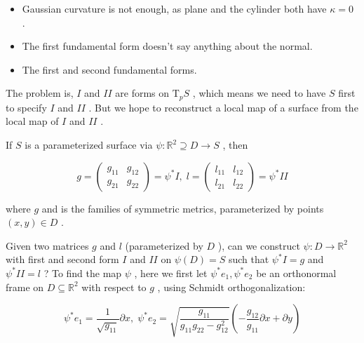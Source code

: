 \documentclass[lang=cn,a4paper,11pt,openany,twoside]{elegantbook}
\begin{document}
\begin{itemize}\relax
\item\relax Gaussian curvature is not enough, as plane and the cylinder both have \(\kappa  = 0\) .
\end{itemize}

\begin{itemize}\relax
\item\relax The first fundamental form doesn't say anything about the normal.
\end{itemize}

\begin{itemize}\relax
\item\relax The first and second fundamental forms.
\end{itemize}

The problem is, \(I\) and \({II}\) are forms on \({\mathrm{T}}_{p}S\) , which means we need to have \(S\) first to specify \(I\) and \({II}\) . But we hope to reconstruct a local map of a surface from the local map of \(I\) and \({II}\) .

If \(S\) is a parameterized surface via \(\psi  : {\mathbb{R}}^{2} \supseteq  D \rightarrow  S\) , then

\[
g = \left( \begin{array}{ll} {g}_{11} & {g}_{12} \\  {g}_{21} & {g}_{22} \end{array}\right)  = {\psi }^{ * }I,\;l = \left( \begin{array}{ll} {l}_{11} & {l}_{12} \\  {l}_{21} & {l}_{22} \end{array}\right)  = {\psi }^{ * }{II}
\]

where \(g\) and is the families of symmetric metrics, parameterized by points \(\left( {x,y}\right)  \in  D\) .

Given two matrices \(g\) and \(l\) (parameterized by \(D\) ), can we construct \(\psi  : D \rightarrow  {\mathbb{R}}^{2}\) with first and second form \(I\) and \({II}\) on \(\psi \left( D\right)  = S\) such that \({\psi }^{ * }I = g\) and \({\psi }^{ * }{II} = l\) ? To find the map \(\psi\) , here we first let \({\psi }^{ * }{e}_{1},{\psi }^{ * }{e}_{2}\) be an orthonormal frame on \(D \subseteq  {\mathbb{R}}^{2}\) with respect to \(g\) , using Schmidt orthogonalization:

\[
{\psi }^{ * }{e}_{1} = \frac{1}{\sqrt{{g}_{11}}}\partial x,\;{\psi }^{ * }{e}_{2} = \sqrt{\frac{{g}_{11}}{{g}_{11}{g}_{22} - {g}_{12}^{2}}}\left( {-\frac{{g}_{12}}{{g}_{11}}\partial x + \partial y}\right)
\]
\end{document}
